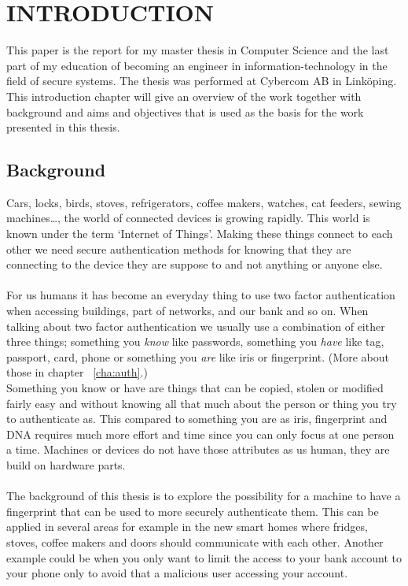 \chapter{INTRODUCTION}\label{cha:intro}
This paper is the report for my master thesis in Computer Science and the last part of my education of becoming an engineer in information-technology in the field of secure systems. The thesis was performed at Cybercom AB in Linköping. \\
This introduction chapter will give an overview of the work together with background and aims and objectives that is used as the basis for the work presented in this thesis. 

\section{Background}\label{sec:bg}
Cars, locks, birds, stoves, refrigerators, coffee makers, watches, cat feeders, sewing machines\dots, the world of connected devices is growing rapidly. This world is known under the term `Internet of Things'. Making these things connect to each other we need secure authentication methods for knowing that they are connecting to the device they are suppose to and not anything or anyone else. \\
\\
For us humans it has become an everyday thing to use two factor authentication when accessing buildings, part of networks, and our bank and so on. When talking about two factor authentication we usually use a combination of either three things; something you \textit{know} like passwords, something you \textit{have} like tag, passport, card, phone or something you \textit{are} like iris or fingerprint. (More about those in chapter ~\ref{cha:auth}.)  \\
Something you know or have are things that can be copied, stolen or modified fairly easy and without knowing all that much about the person or thing you try to authenticate as. This compared to something you are as iris, fingerprint and DNA requires much more effort and time since you can only focus at one person a time. Machines or devices do not have those attributes as us human, they are build on hardware parts.\\ 
\\
The background of this thesis is to explore the possibility for a machine to have a fingerprint that can be used to more securely authenticate them. This can be applied in several areas for example in the new smart homes where fridges, stoves, coffee makers and doors should communicate with each other. Another example could be when you only want to limit the access to your bank account to your phone only to avoid that a malicious user accessing your account.

